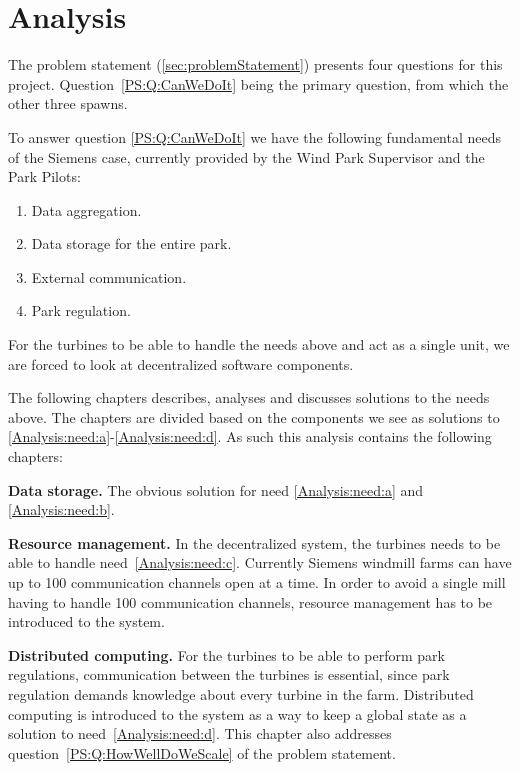 \chapter{Analysis}

The problem statement (\cref{sec:problemStatement}) presents four questions for this project. Question~\ref{PS:Q:CanWeDoIt} being the primary question, from which the other three spawns. 

To answer question \ref{PS:Q:CanWeDoIt} we have the following fundamental needs of the Siemens case, currently provided by the Wind Park Supervisor and the Park Pilots:
\begin{enumerate}[label=\textbf{\alph*.}, ref=\textit{\alph*}]
\item \label{Analysis:need:a} Data aggregation.
\item \label{Analysis:need:b} Data storage for the entire park.
\item \label{Analysis:need:c} External communication.
\item \label{Analysis:need:d} Park regulation.
\end{enumerate}

For the turbines to be able to handle the needs above and act as a single unit, we are forced to look at decentralized software components. 

The following chapters describes, analyses and discusses solutions to the needs above. The chapters are divided based on the components we see as solutions to \ref{Analysis:need:a}-\ref{Analysis:need:d}. As such this analysis contains the following chapters:

\begin{description}
\item{\textbf{Data storage.}} The obvious solution for need \ref{Analysis:need:a} and \ref{Analysis:need:b}.
\item{\textbf{Resource management.}} In the decentralized system, the turbines needs to be able to handle need~\ref{Analysis:need:c}. Currently Siemens windmill farms can have up to 100 communication channels open at a time. In order to avoid a single mill having to handle 100 communication channels, resource management has to be introduced to the system.
\item{\textbf{Distributed computing.}} For the turbines to be able to perform park regulations, communication between the turbines is essential, since park regulation demands knowledge about every turbine in the farm. Distributed computing is introduced to the system as a way to keep a global state as a solution to need~\ref{Analysis:need:d}. This chapter also addresses question~\ref{PS:Q:HowWellDoWeScale} of the problem statement.
\end{description}


